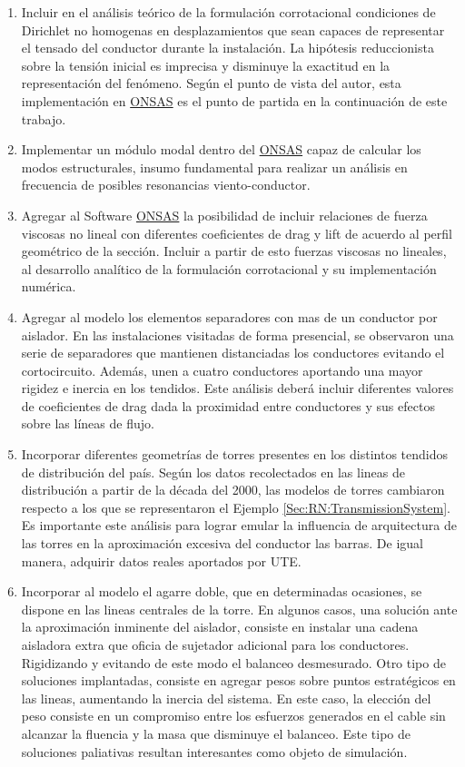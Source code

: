\begin{enumerate}
	\item Incluir en el análisis teórico de la formulación corrotacional condiciones de Dirichlet no homogenas en desplazamientos que sean capaces de  representar el tensado del conductor durante la instalación. La hipótesis reduccionista sobre la tensión inicial es imprecisa y disminuye la exactitud en la representación del fenómeno. Según el punto de vista del autor, esta implementación en \href{https://github.com/ONSAS/ONSAS/}{ONSAS} es el punto de partida en la continuación de este trabajo. 
	\item Implementar un módulo modal dentro del \href{https://github.com/ONSAS/ONSAS/}{ONSAS} capaz de calcular los modos estructurales, insumo fundamental para realizar un análisis en frecuencia de posibles resonancias viento-conductor.
	\item Agregar al Software  \href{https://github.com/ONSAS/ONSAS/}{ONSAS} la posibilidad de incluir relaciones de fuerza viscosas no lineal con diferentes coeficientes de drag y lift de acuerdo al perfil geométrico de la sección. Incluir a partir de esto fuerzas viscosas no lineales, al desarrollo analítico de la formulación corrotacional y su implementación numérica. 
	\item Agregar al modelo los elementos separadores con mas de un conductor por aislador. En las instalaciones visitadas de forma presencial, se observaron una serie de separadores que mantienen distanciadas los conductores evitando el cortocircuito. Además, unen a cuatro conductores aportando una mayor rigidez e inercia en los tendidos. Este análisis deberá incluir diferentes valores de coeficientes de drag dada la proximidad entre conductores y sus efectos sobre las líneas de flujo.  
	\item Incorporar diferentes geometrías de torres presentes en los distintos tendidos de distribución del país. Según los datos recolectados en las lineas de distribución a partir de la década del 2000, las modelos de torres cambiaron respecto a los que se representaron el Ejemplo \ref{Sec:RN:TransmissionSystem}. Es importante este análisis para lograr emular la influencia de arquitectura de las torres en la aproximación excesiva del conductor las barras. De igual manera, adquirir datos reales aportados por UTE.
	\item Incorporar al modelo el agarre doble, que en determinadas ocasiones, se dispone en las lineas centrales de la torre. En algunos casos, una solución ante la aproximación inminente del aislador, consiste en instalar una cadena aisladora extra que oficia de sujetador adicional para los conductores. Rigidizando y evitando de este modo el balanceo desmesurado. Otro tipo de soluciones implantadas, consiste en agregar pesos sobre puntos estratégicos en las lineas, aumentando la inercia del sistema. En este caso, la elección del peso consiste en un compromiso entre los esfuerzos generados en el cable sin alcanzar la fluencia y la masa que disminuye el balanceo. Este tipo de soluciones paliativas resultan interesantes como objeto de simulación.	

\end{enumerate}
